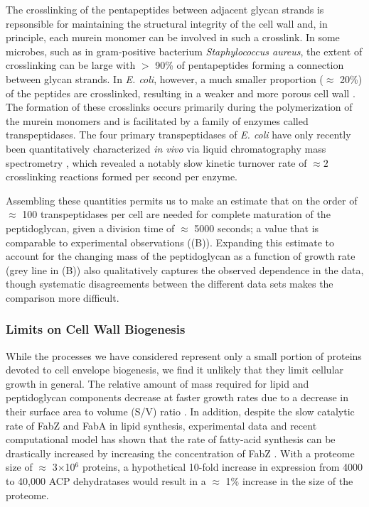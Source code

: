 The crosslinking of the pentapeptides between adjacent glycan strands is
repsonsible for maintaining the structural integrity of the cell wall and, in
principle, each murein monomer can be involved in such a crosslink. In some
microbes, such as in gram-positive bacterium \textit{Staphylococcus aureus},
the extent of crosslinking can be large with $>$ 90\% of pentapeptides
forming a connection between glycan strands. In \textit{E. coli}, however, a
much smaller proportion ($\approx$ 20\%) of the peptides are crosslinked,
resulting in a weaker and more porous cell wall \cite{vollmer2008a,
rogers1980}. The formation of these crosslinks occurs primarily during the
polymerization of the murein monomers and is facilitated by a family of
enzymes called transpeptidases. The four primary transpeptidases of
\textit{E. coli} have only recently been quantitatively characterized
\textit{in vivo} via liquid chromatography mass spectrometry
\citep{catherwood2020}, which revealed a notably slow kinetic turnover rate
of $\approx 2$ crosslinking reactions formed per second per enzyme.

Assembling these quantities permits us to make an estimate that on the order of
$\approx$ 100 transpeptidases per cell are needed for complete maturation of the
peptidoglycan, given a division time of $\approx$ 5000 seconds; a value that is
comparable to experimental observations ((B)). Expanding this
estimate to account for the changing mass of the peptidoglycan as a function
of growth rate (grey line in (B)) also qualitatively captures
the observed dependence in the data, though systematic disagreements between the
different data sets makes the comparison more difficult.

\subsubsection{Limits on Cell Wall Biogenesis}
While the processes we have considered represent only a small portion of
proteins devoted to cell envelope biogenesis, we find it unlikely that they limit
cellular growth in general. The relative amount of mass required for lipid and
peptidoglycan components decrease at faster growth rates due to a decrease in
their surface area to volume (S/V) ratio \citep{ojkic2019}. In addition, despite the slow catalytic
rate of FabZ and FabA in lipid synthesis, experimental data and recent
computational model has shown that the rate of fatty-acid synthesis can be
drastically increased by increasing the concentration of FabZ \citep{yu2011,
ruppe2018}. With a proteome size of $\approx$ 3$\times$10$^6$ proteins, a
hypothetical 10-fold increase in expression from 4000 to 40,000 ACP dehydratases
would result in a $\approx$ 1\% increase in the size of the proteome.

